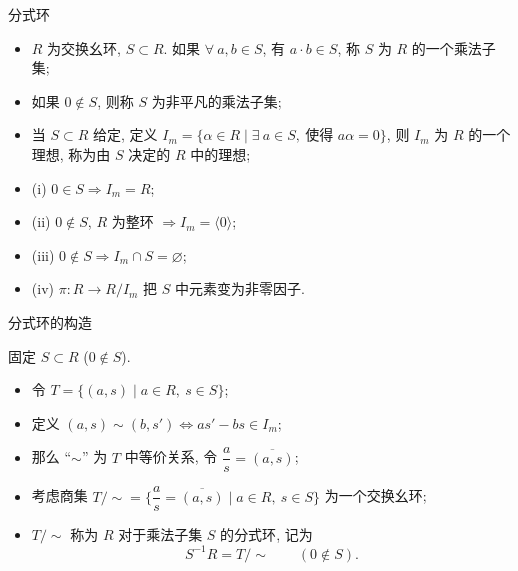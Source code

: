 
\begin{frame}{分式环}

\begin{itemize}
\item $R$ 为交换幺环, $S \subset R$. 如果 $\forall\ a, b \in S$, 有 $a \cdot b \in S$,
  称 $S$ 为 $R$ 的一个\alert{乘法子集};
\item 如果 $0 \notin S$, 则称 $S$ 为\alert{非平凡的}乘法子集;
\item 当 $S \subset R$ 给定, 定义
  $I_m = \{ \alpha \in R \mid \exists\ a \in S,\ \text{使得 } a \alpha = 0 \}$,
  则 $I_m$ 为 $R$ 的一个理想, 称为由 $S$ 决定的 $R$ 中的理想;
\item (i) $0 \in S \Longrightarrow I_m = R$;
\item (ii) $0 \notin S$, $R$ 为整环 $\Longrightarrow I_m = \langle 0 \rangle$;
\item (iii) $0 \notin S \Longrightarrow I_m \cap S = \varnothing$;
\item (iv) $\pi: R \to R/I_m$ 把 $S$ 中元素变为非零因子.
\end{itemize}

\end{frame}


\begin{frame}{分式环的构造}

固定 $S \subset R$ ($0 \notin S$).

\begin{itemize}
\item 令 $T = \{ (a, s) \mid a \in R,\ s \in S \}$;
\item 定义 $(a, s) \sim (b, s') \iff a s' - b s \in I_m$;
\item 那么 ``$\sim$'' 为 $T$ 中等价关系, 令 $\dfrac{a}{s} = \overline{(a, s)}$;
\item 考虑商集
  $T / {\sim} = \Big\{ \dfrac{a}{s} = \overline{(a, s)} \;\Big|\; a \in R,\ s \in S \Big\}$
  为一个交换幺环;
\item $T / {\sim}$ 称为 $R$ 对于乘法子集 $S$ 的\alert{分式环}, 记为
  \[
  S^{-1} R = T / {\sim}
  \qquad (0 \notin S).
  \]
\end{itemize}

\end{frame}


